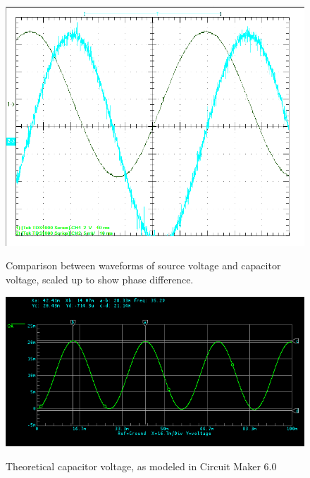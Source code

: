 \documentclass[twocolumn,english]{IEEEtran}
\theoremstyle{plain}
\theoremstyle{plain}
\begin{document}
\begin{figure}[h!]
  \begin{centering}
  \begin{center}
  \includegraphics[width=\linewidth]{./comparison.png}
  \label{fig:parallel_diagram}
  \caption{Comparison between waveforms of source voltage and capacitor voltage, scaled up to show phase difference.}
  \end{center}
  \par\end{centering}
  \end{figure}

  \begin{figure}[h!]
  \begin{centering}
  \begin{center}
  \includegraphics[width=\linewidth]{./waveform.png}
  \label{fig:theory_wave}
  \caption{Theoretical capacitor voltage, as modeled in Circuit Maker 6.0}
  \end{center}
  \par\end{centering}
  \end{figure}
\end{document}
